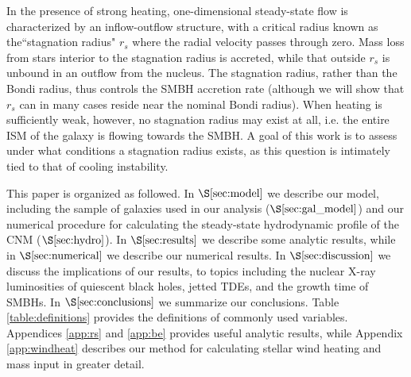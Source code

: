 \documentclass[usenatbib,fleqn]{mn2e}
\newcommand{\rs}{r_s}
\begin{document}
In the presence of strong heating, one-dimensional steady-state flow
is characterized by an inflow-outflow structure, with a critical
radius known as the``stagnation radius" $\rs$ where the radial
velocity passes through zero.  Mass loss from stars interior to the
stagnation radius is accreted, while that outside $\rs$ is unbound in
an outflow from the nucleus.  The stagnation radius, rather than the
Bondi radius, thus controls the SMBH accretion rate (although we will
show that $\rs$ can in many cases reside near the
nominal Bondi radius).  When heating is sufficiently weak, however, no stagnation radius may exist at all, i.e. the entire ISM of the galaxy is flowing towards the SMBH.  A goal of this work is to
assess under what conditions a stagnation radius exists, as this
question is intimately tied to that of cooling instability.


This paper is organized as followed.  In $\S\ref{sec:model}$ we
describe our model, including the sample of galaxies used in our
analysis ($\S\ref{sec:gal_model}$) and our numerical procedure for
calculating the steady-state hydrodynamic profile of the CNM
($\S\ref{sec:hydro}$).  In $\S\ref{sec:results}$ we describe some
analytic results, while in $\S\ref{sec:numerical}$ we describe our
numerical results.  In $\S\ref{sec:discussion}$ we discuss the
implications of our results, to topics including the nuclear X-ray luminosities of quiescent black holes, jetted TDEs, and the growth time of SMBHs.  In $\S\ref{sec:conclusions}$ we summarize our conclusions.  Table
\ref{table:definitions} provides the definitions of commonly used
variables.  Appendices \ref{app:rs} and \ref{app:be} provides useful
analytic results, while Appendix \ref{app:windheat} describes our
method for calculating stellar wind heating and mass input in greater
detail.
\end{document}

